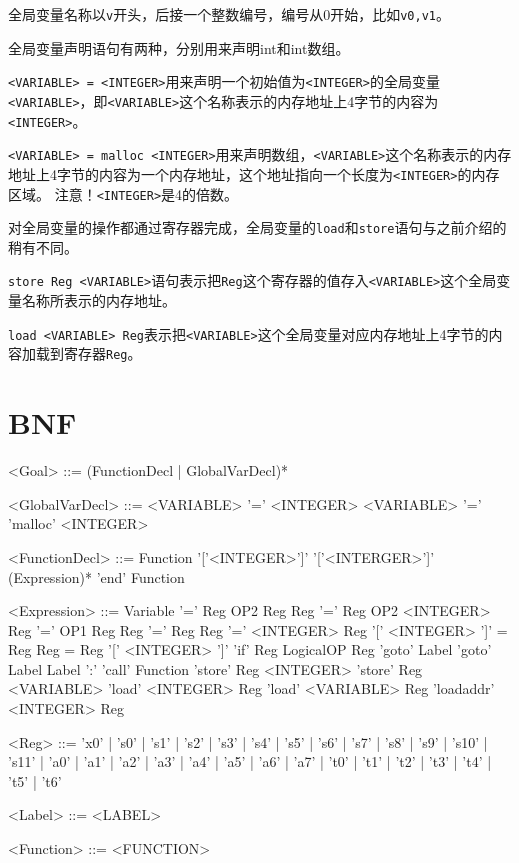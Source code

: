 \documentclass{ctexart}
\newenvironment{typewriterfont}{\ttfamily}{\par}
\begin{document}
全局变量名称以\texttt{v}开头，后接一个整数编号，编号从0开始，比如\texttt{v0,v1}。

全局变量声明语句有两种，分别用来声明int和int数组。

\texttt{<VARIABLE> = <INTEGER>}用来声明一个初始值为\texttt{<INTEGER>}的全局变量\texttt{<VARIABLE>}，即\texttt{<VARIABLE>}这个名称表示的内存地址上4字节的内容为\texttt{<INTEGER>}。

\texttt{<VARIABLE> = malloc <INTEGER>}用来声明数组，\texttt{<VARIABLE>}这个名称表示的内存地址上4字节的内容为一个内存地址，这个地址指向一个长度为\texttt{<INTEGER>}的内存区域。
注意！\texttt{<INTEGER>}是4的倍数。

对全局变量的操作都通过寄存器完成，全局变量的\texttt{load}和\texttt{store}语句与之前介绍的稍有不同。

\texttt{store Reg <VARIABLE>}语句表示把\texttt{Reg}这个寄存器的值存入\texttt{<VARIABLE>}这个全局变量名称所表示的内存地址。

\texttt{load <VARIABLE> Reg}表示把\texttt{<VARIABLE>}这个全局变量对应内存地址上4字节的内容加载到寄存器\texttt{Reg}。

\newpage
\section{BNF}
\setlength{\grammarindent}{8em} %
\begin{typewriterfont}
\begin{grammar}
<Goal>  ::= (FunctionDecl | GlobalVarDecl)*

<GlobalVarDecl> ::= <VARIABLE> '=' <INTEGER>
\alt <VARIABLE> '=' 'malloc' <INTEGER>

<FunctionDecl> ::= Function '['<INTEGER>']' '['<INTERGER>']' (Expression)* 'end' Function

<Expression>	::=	Variable '=' Reg OP2 Reg
\alt Reg '=' Reg OP2 <INTEGER>
\alt Reg '=' OP1 Reg
\alt Reg '=' Reg
\alt Reg '=' <INTEGER>
\alt Reg '[' <INTEGER> ']' = Reg
\alt Reg = Reg '[' <INTEGER> ']'
\alt 'if' Reg LogicalOP Reg 'goto' Label
\alt 'goto' Label
\alt Label ':'
\alt 'call' Function
\alt 'store' Reg <INTEGER>
\alt 'store' Reg <VARIABLE>
\alt 'load' <INTEGER> Reg
\alt 'load' <VARIABLE> Reg
\alt 'loadaddr' <INTEGER> Reg

<Reg> ::= 'x0'
| 's0'
| 's1'
| 's2'
| 's3'
| 's4'
| 's5'
| 's6'
| 's7'
| 's8'
| 's9'
| 's10'
| 's11'
| 'a0'
| 'a1'
| 'a2'
| 'a3'
| 'a4'
| 'a5'
| 'a6'
| 'a7'
| 't0'
| 't1'
| 't2'
| 't3'
| 't4'
| 't5'
| 't6'

<Label> ::= <LABEL>

<Function> ::= <FUNCTION>

\end{grammar}
\end{typewriterfont}
\end{document}
